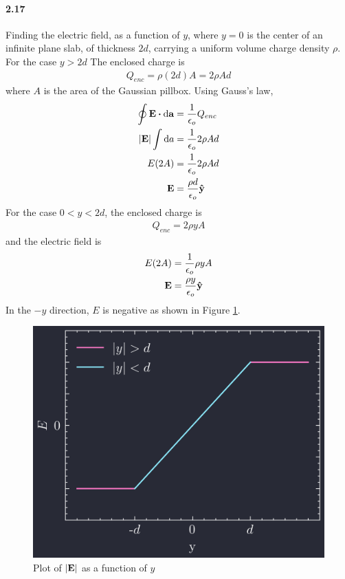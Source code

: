 \documentclass[../main.tex]{subfiles}
\begin{document}
\paragraph{2.17}
Finding the electric field, as a function of $y$, where $y=0$ is the center of an infinite plane
slab, of thickness $2d$, carrying a uniform volume charge density $\rho$. For the case \(y > 2d\)
The enclosed charge is
\begin{align*}
    Q_{enc} = \rho (2d) A = 2\rho Ad
\end{align*}
where $A$ is the area of the Gaussian pillbox. Using Gauss's law,
\begin{align*}
    \oint \vb{E} \vdot \dd{\vb{a}} &= \frac{1}{\epsilon_o} Q_{enc} \\
    \abs{\vb{E}} \int \dd{a} &= \frac{1}{\epsilon_o} 2\rho Ad \\
    E (2A) &= \frac{1}{\epsilon_o} 2\rho Ad \\
    \vb{E} &= \frac{\rho d}{\epsilon_o} \vu{y}
\end{align*}
For the case \(0 < y < 2d\), the enclosed charge is
\begin{align*}
    Q_{enc} = 2\rho y A
\end{align*}
and the electric field is
\begin{align*}
    E (2A) &= \frac{1}{\epsilon_o} \rho y A \\
    \vb{E} &= \frac{\rho y}{\epsilon_o} \vu{y}
\end{align*}
In the $-y$ direction, $E$ is negative as shown in Figure \ref{fig:2_17}.
\begin{figure}
    \centering
    \includegraphics[width=0.5\linewidth]{images/fig2_17.png}
    \captionsetup{width=0.8\linewidth}
    \caption{Plot of $\abs{\vb{E}}$ as a function of $y$}
    \label{fig:2_17}
\end{figure}
\end{document}
